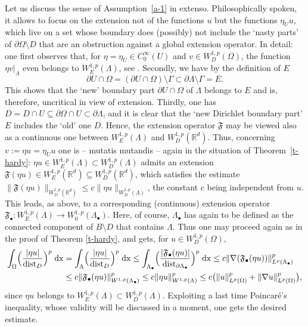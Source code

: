 \documentclass[10pt,leqno]{amsart}
\theoremstyle{definition}
\numberwithin{equation}{section}
\begin{document}
Let us discuss the sense of Assumption~\ref{a-1} in extenso. Philosophically
spoken, it allows to focus on the extension not of the functions $u$ but the
functions $\eta_U u$, which live on a set whose boundary does (possibly) not
include the `nasty parts' of $\partial \Omega \setminus D$ that are an
obstruction against a global extension operator. In detail: one first observes
that, for $\eta = \eta_U \in C^\infty_0(U)$ and $v \in W^{1,p}_D(\Omega)$, the
function $\eta v|_\Lambda$ even belongs to $W^{1,p}_E(\Lambda)$, see
\cite[Thm. 5.8]{haller}. Secondly, we have by the definition of $E$
\[ \partial U \cap \Omega = (\partial U \cap \Omega) \setminus \Gamma \subset
	\partial \Lambda \setminus \Gamma = E.
\]
This shows that the `new' boundary part $\partial U \cap \Omega$ of $\Lambda$
belongs to $E$ and is, therefore, uncritical in view of extension. Thirdly,
one has $D = D \cap U \subseteq \partial \Omega \cap U \subset
\partial \Lambda$, and it is clear that the `new Dirichlet boundary part' $E$
includes the `old' one $D$. Hence, the extension operator $\mathfrak F$ may be
viewed also as a continuous one between $W^{1,p}_E(\Lambda)$ and
$W^{1,p}_D({{\mathbb R}}^d)$. Thus, concerning $v := \eta u = \eta_U u$ one is -- mutatis
mutandis -- again in the situation of Theorem~\ref{t-hardy}: $\eta u \in
W^{1,p}_E(\Lambda) \subset W^{1,p}_D(\Lambda)$ admits an extension
$\mathfrak F(\eta u) \in W^{1,p}_E({{\mathbb R}}^d) \subseteq W^{1,p}_D({{\mathbb R}}^d)$, which 
satisfies the estimate $\|\mathfrak F(\eta u)\|_{W^{1,p}_D({{\mathbb R}}^d)} \le c \|\eta
u\|_{W^{1,p}_D(\Lambda)}$, the constant $c$ being independent from $u$. This
leads, as above, to a corresponding (continuous) extension operator
$\mathfrak F_\bullet : W^{1,p}_E(\Lambda) \to W^{1,p}_0(\Lambda_\bullet)$.
Here, of course, $\Lambda_\bullet$ has again to be defined as the connected
component of $B \setminus D$ that contains $\Lambda$. Thus one may proceed
again as in the proof of Theorem \ref{t-hardy}, and gets, for $u \in
W^{1,p}_D(\Omega)$,
\begin{align*}
  \int_\Omega \Bigl( \frac{|\eta u|}{{\operatorname{dist}}_D} \Bigr)^p \; \mathrm{d} {{\mathrm x}}
	&= \int_\Lambda \Bigl( \frac{|\eta u|}{{\operatorname{dist}}_D} \Bigr)^p
	\; \mathrm{d} {{\mathrm x}} \le \int_{\Lambda_\bullet} \Bigl(
	\frac{|\mathfrak F_\bullet (\eta u)|}{{\operatorname{dist}}_{\partial \Lambda_\bullet}}
	\Bigr)^p \; \mathrm{d} {{\mathrm x}} \le c \|\nabla (\mathfrak F_\bullet
	(\eta u))\|^p_{L^p(\Lambda_\bullet)} \\
  &\le c \|\mathfrak F_\bullet (\eta u)\|^p_{W^{1,p}(\Lambda_\bullet)} \le c
	\|\eta u\|^p_{W^{1,p}(\Lambda)} \le c \bigl( \|u\|_{L^p(\Omega)}^p +
	\|\nabla u\|_{L^p(\Omega)}^p \bigr),
\end{align*}
since $\eta u$ belongs to $W^{1,p}_E(\Lambda) \subset W^{1,p}_D(\Lambda)$.
Exploiting a last time Poincar\'e's inequality, whose validity will be
discussed in a moment, one gets the desired estimate.
\end{document}
